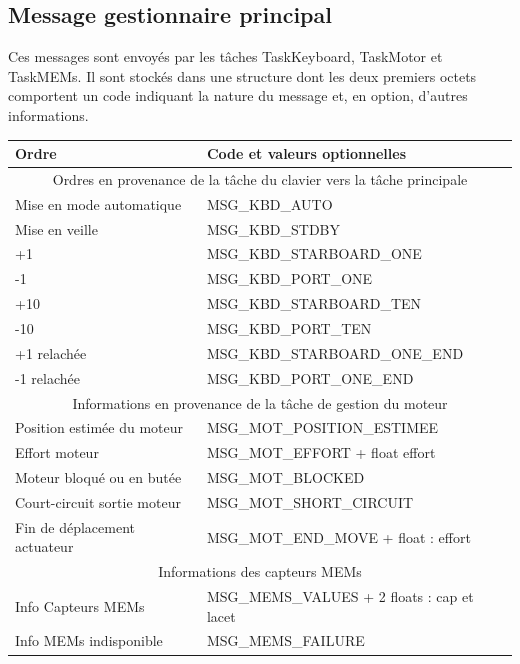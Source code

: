 \documentclass[a4paper,11pt]{report}
\begin{document}
\subsection{Message gestionnaire principal}
Ces messages sont envoyés par les tâches TaskKeyboard, TaskMotor et TaskMEMs.
Il sont stockés dans une structure dont les deux premiers octets comportent
un code indiquant la nature du message et, en option, d'autres informations.
\\
\begin{tabular}{|l|l|}
\hline 
Ordre & Code et valeurs optionnelles \\
\hline
\multicolumn{2}{|c|}{Ordres en provenance de la tâche du clavier vers la tâche principale} \\
\hline 
Mise en mode automatique & MSG\_KBD\_AUTO \\ 
Mise en veille & MSG\_KBD\_STDBY \\ 
+1 & MSG\_KBD\_STARBOARD\_ONE \\ 
-1 & MSG\_KBD\_PORT\_ONE \\ 
+10 & MSG\_KBD\_STARBOARD\_TEN \\ 
-10 & MSG\_KBD\_PORT\_TEN \\ 
+1 relachée & MSG\_KBD\_STARBOARD\_ONE\_END \\ 
-1 relachée & MSG\_KBD\_PORT\_ONE\_END \\ 
\hline 
\multicolumn{2}{|c|}{Informations en provenance de la tâche de gestion du moteur} \\
\hline
Position estimée du moteur & MSG\_MOT\_POSITION\_ESTIMEE \\
Effort moteur & MSG\_MOT\_EFFORT + float effort\\ 
Moteur bloqué ou en butée & MSG\_MOT\_BLOCKED \\
Court-circuit sortie moteur & MSG\_MOT\_SHORT\_CIRCUIT \\
Fin de déplacement actuateur & MSG\_MOT\_END\_MOVE + float : effort \\
\hline
\multicolumn{2}{|c|}{Informations des capteurs MEMs}\\
\hline
Info Capteurs MEMs & MSG\_MEMS\_VALUES + 2 floats : cap et lacet \\
Info MEMs indisponible & MSG\_MEMS\_FAILURE \\

\hline
\end{tabular} 
\end{document}
